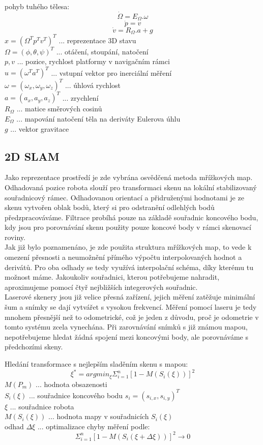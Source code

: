 \documentclass[11pt]{article}
\begin{document}
pohyb tuhého tělesa:
$$\dot{\Omega}=E_\Omega.\omega$$
$$\dot{p}=v$$
$$\dot{v}=R_\Omega.a+g$$
$x=(\Omega^T p^T v^T)^T$ ... reprezentace 3D stavu\\
$\Omega=(\phi,\theta,\psi)^T$ ... otáčení, stoupání, natočení\\
$p,v$ ... pozice, rychlost platformy v navigačním rámci\\
$u=(\omega^T a^T)^T$ ... vstupní vektor pro inerciální měření\\
$\omega=(\omega_x,\omega_y,\omega_z)^T$ ... úhlová rychlost\\
$a=(a_x,a_y,a_z)^T$ ... zrychlení\\
$R_\Omega$ ... matice směrových cosinů\\
$E_\Omega$ ... mapování natočení těla na deriváty Eulerova úhlu\\
$g$ ... vektor gravitace\\

\subsection{2D SLAM}
Jako reprezentace prostředí je zde vybrána osvědčená metoda mřížkových map. Odhadovaná pozice robota slouží pro transformaci skenu na lokální stabilizovaný souřadnicový rámec. Odhadovanou orientací a přidruženými hodnotami je ze skenu vytvořen oblak bodů, který si pro odstranění odlehlých bodů předzpracováváme. Filtrace probíhá pouze na základě souřadnic koncového bodu, kdy jsou pro porovnávání skenu použity pouze koncové body v rámci skenovací roviny.\\
\indent Jak již bylo poznamenáno, je zde použita struktura mřížkových map, to vede k omezení přesnosti a neumožnění přímého výpočtu interpolovaných hodnot a derivátů. Pro oba odhady se tedy využívá interpolační schéma, díky kterému tu možnost máme. Jakoukoliv souřadnici, kterou potřebujeme nahradit, aproximujeme pomocí čtyř nejbližších integerových souřadnic. \\
\indent Laserové skenery jsou již velice přesná zařízení, jejich měření zatěžuje minimální šum a snímky se dají vytvářet s vysokou frekvencí. Měření pomocí laseru je tedy mnohem přesnější než to odometrické, což je jeden z důvodu, proč je odometrie v tomto systému zcela vynechána. Při zarovnávání snímků s již známou mapou, nepotřebujeme hledat žádná spojení mezi koncovými body, ale porovnáváme s předchozími skeny.  

Hledání transformace s nejlepším sladěním skenu s mapou:
$$\xi^*=argmin_\xi\Sigma_{i=1}^n[1-M(S_i(\xi))]^2$$
$M(P_m)$ ... hodnota obsazenosti\\
$S_i(\xi)$ ... souřadnice koncového bodu $s_i=(s_{i,x},s_{i,y})^T$\\
$\xi$ ... souřadnice robota\\
$M(S_i(\xi))$ ... hodnota mapy v souřadnicích $S_i(\xi)$\\
odhad $\Delta\xi$ ... optimalizace chyby měření podle: 
$$\Sigma_{i=1}^n[1-M(S_i(\xi+\Delta\xi))]^2\rightarrow 0$$
\end{document}
